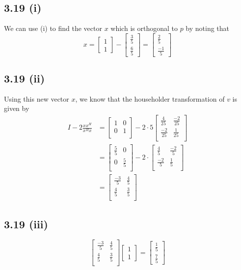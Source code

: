 \documentclass[letterpaper,12pt]{article}
\theoremstyle{definition}
\begin{document}
\subsection*{3.19 (i)}
We can use (i) to find the vector $x$ which is orthogonal to $p$ by noting that
\[x=
\begin{bmatrix}
    1\\1
\end{bmatrix}
-
\begin{bmatrix}
    \frac{3}{5}\\\frac{6}{5}
\end{bmatrix}
= 
\begin{bmatrix}
    \frac{2}{5}\\\frac{-1}{5}
\end{bmatrix}
\]
\subsection*{3.19 (ii)}
Using this new vector $x$, we know that the householder transformation of $v$ is given by 
\begin{align*}
I - 2 \frac{xx^H}{x^Hx} &= 
\begin{bmatrix}
    1 & 0 \\
    0 & 1 \\
\end{bmatrix}
-
2 \cdot 5 
\begin{bmatrix}
    \frac{4}{25} & \frac{-2}{25}\\
    \frac{-2}{25} & \frac{1}{25}\\
\end{bmatrix}\\
&=
\begin{bmatrix}
    \frac{5}{5} & 0 \\
    0 & \frac{5}{5} \\
\end{bmatrix}
-
2 \cdot  
\begin{bmatrix}
    \frac{4}{5} & \frac{-2}{5}\\
    \frac{-2}{5} & \frac{1}{5}\\
\end{bmatrix}\\
&=
\begin{bmatrix}
    \frac{-3}{5} & \frac{4}{5}\\
    \frac{4}{5} & \frac{3}{5}\\
\end{bmatrix}
\end{align*}
\subsection*{3.19 (iii)}
\[
\begin{bmatrix}
    \frac{-3}{5} & \frac{4}{5}\\
    \frac{4}{5} & \frac{3}{5}\\
\end{bmatrix}
\begin{bmatrix}
    1\\1
\end{bmatrix}
= 
\begin{bmatrix}
    \frac{1}{5}\\\frac{7}{5}
\end{bmatrix}
\]
\end{document}
